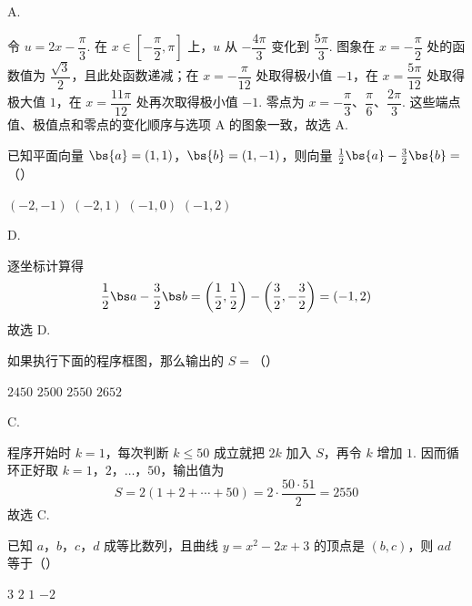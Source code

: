 \begin{answer}
A.
\end{answer}

\begin{solution}
令 \(u=2x-\dfrac{\pi}{3}\). 在 \(x\in\left[-\dfrac{\pi}{2},\pi\right]\) 上，\(u\) 从 \(-\dfrac{4\pi}{3}\) 变化到 \(\dfrac{5\pi}{3}\). 图象在 \(x=-\dfrac{\pi}{2}\) 处的函数值为 \(\dfrac{\sqrt{3}}{2}\)，且此处函数递减；在 \(x=-\dfrac{\pi}{12}\) 处取得极小值 \(-1\)，在 \(x=\dfrac{5\pi}{12}\) 处取得极大值 \(1\)，在 \(x=\dfrac{11\pi}{12}\) 处再次取得极小值 \(-1\). 零点为 \(x=-\dfrac{\pi}{3}\)、\(\dfrac{\pi}{6}\)、\(\dfrac{2\pi}{3}\). 这些端点值、极值点和零点的变化顺序与选项 A 的图象一致，故选 A.
\end{solution}

\begin{problem}
已知平面向量 \( \bs{a} = (1, 1) \)，\( \bs{b} = (1, -1) \)，则向量 \( \frac{1}{2}\bs{a} - \frac{3}{2}\bs{b} = \)（\quad）

\choices
    {\((-2, - 1)\)}
    {\((-2, 1)\)}
    {\((-1, 0)\)}
    {\((-1, 2)\)}
\end{problem}

\begin{answer}
D.
\end{answer}

\begin{solution}
逐坐标计算得
\[
\frac{1}{2}\bs a-\frac{3}{2}\bs b
=\left(\frac12,\frac12\right)-\left(\frac32,-\frac32\right)
=\left(-1,2\right)
\]
故选 D.
\end{solution}

\begin{problem}
如果执行下面的程序框图，那么输出的 \(S =\)（\quad）


\choices
    {\(2450\)}
    {\(2500\)}
    {\(2550\)}
    {\(2652\)}
\end{problem}

\begin{answer}
C.
\end{answer}

\begin{solution}
程序开始时 \(k=1\)，每次判断 \(k\leqslant50\) 成立就把 \(2k\) 加入 \(S\)，再令 \(k\) 增加 \(1\). 因而循环正好取 \(k=1\)，\(2\)，\(\ldots\)，\(50\)，输出值为
\[
S=2(1+2+\cdots+50)=2\cdot\frac{50\cdot51}{2}=2550
\]
故选 C.
\end{solution}

\begin{problem}
已知 \(a\)，\(b\)，\(c\)，\(d\) 成等比数列，且曲线 \(y = x^2 - 2x + 3\) 的顶点是 \((b, c)\)，则 \(ad\) 等于（\quad）

\choices
    {\(3\)}
    {\(2\)}
    {\(1\)}
    {\(-2\)}
\end{problem}

